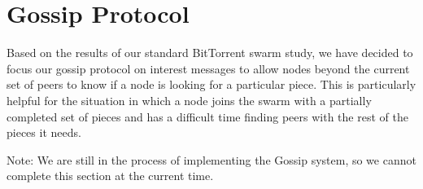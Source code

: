 \section{Gossip Protocol}

Based on the results of our standard BitTorrent swarm study, we have
decided to focus our gossip protocol on interest messages to allow
nodes beyond the current set of peers to know if a node is looking for
a particular piece. This is particularly helpful for the situation in
which a node joins the swarm with a partially completed set of pieces
and has a difficult time finding peers with the rest of the pieces it
needs.

Note: We are still in the process of implementing the Gossip system, so
we cannot complete this section at the current time.

